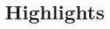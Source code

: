\documentclass[12pt]{article}
\begin{document}
\section*{Highlights}
\begin{itemize}

\end{itemize}
\end{document}
